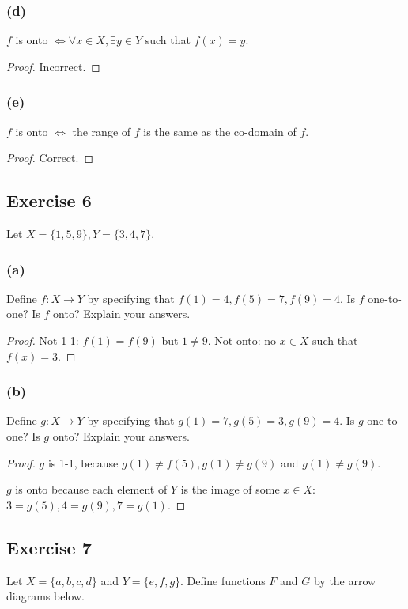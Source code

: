 \documentclass[14pt]{extarticle}
\begin{document}
\subsubsection{(d)}
$f$ is onto \(\iff \forall x \in X, \exists y \in Y\) such that \(f(x) = y\).

\begin{proof}
    Incorrect.
\end{proof}

\subsubsection{(e)}
$f$ is onto $\iff$ the range of $f$ is the same as the co-domain of $f$.

\begin{proof}
    Correct.
\end{proof}

\subsection{Exercise 6}
Let \(X = \{1, 5, 9\}, Y = \{3, 4, 7\}\).

\subsubsection{(a)}
Define \(f: X \to Y\) by specifying that \(f(1) = 4, f(5) = 7, f(9) = 4\). Is $f$ one-to-one? Is $f$ onto?
Explain your answers.

\begin{proof}
    Not 1-1: \(f(1) = f(9)\) but \(1 \neq 9\). Not onto: no $x \in X$ such that $f(x) = 3$.
\end{proof}

\subsubsection{(b)}
Define \(g: X \to Y\) by specifying that \(g(1) = 7, g(5) = 3, g(9) = 4\). Is $g$ one-to-one? Is $g$ onto?
Explain your answers.

\begin{proof}
    $g$ is 1-1, because \(g(1) \neq f(5), g(1) \neq g(9)\) and \(g(1) \neq g(9)\).

    $g$ is onto because each element of $Y$ is the image of some $x \in X$: \(3 = g(5), 4 = g(9), 7 = g(1)\).
\end{proof}

\subsection{Exercise 7}
Let \(X = \{a, b, c, d\}\) and \(Y = \{e, f, g\}\). Define
functions $F$ and $G$ by the arrow diagrams below.
\end{document}
